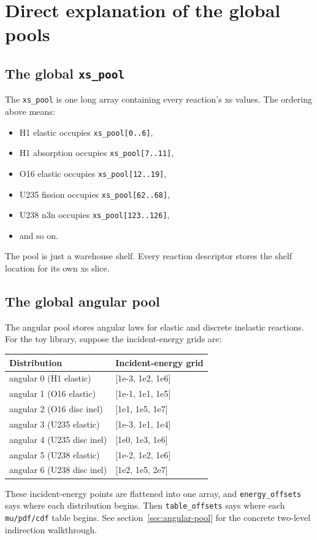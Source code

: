 \documentclass[11pt,a4paper]{article}
\begin{document}
\section{Direct explanation of the global pools}
\subsection{The global \texttt{xs\_pool}}
The \texttt{xs\_pool} is one long array containing every reaction's xs values. The ordering above means:
\begin{itemize}[leftmargin=1.4em]
  \item H1 elastic occupies \texttt{xs\_pool[0..6]},
  \item H1 absorption occupies \texttt{xs\_pool[7..11]},
  \item O16 elastic occupies \texttt{xs\_pool[12..19]},
  \item U235 fission occupies \texttt{xs\_pool[62..68]},
  \item U238 n3n occupies \texttt{xs\_pool[123..126]},
  \item and so on.
\end{itemize}
The pool is just a warehouse shelf. Every reaction descriptor stores the shelf location for its own xs slice.

\subsection{The global angular pool}
The angular pool stores angular laws for elastic and discrete inelastic reactions.
For the toy library, suppose the incident-energy grids are:
\begin{longtable}{p{4.5cm} p{7.0cm}}
\toprule
Distribution & Incident-energy grid \\
\midrule
angular 0 (H1 elastic) & [1e-3, 1e2, 1e6] \\
angular 1 (O16 elastic) & [1e-1, 1e1, 1e5] \\
angular 2 (O16 disc inel) & [1e1, 1e5, 1e7] \\
angular 3 (U235 elastic) & [1e-3, 1e1, 1e4] \\
angular 4 (U235 disc inel) & [1e0, 1e3, 1e6] \\
angular 5 (U238 elastic) & [1e-2, 1e2, 1e6] \\
angular 6 (U238 disc inel) & [1e2, 1e5, 2e7] \\
\bottomrule
\end{longtable}
These incident-energy points are flattened into one array, and \texttt{energy\_offsets} says where each distribution begins. Then \texttt{table\_offsets} says where each \texttt{mu/pdf/cdf} table begins. See section~\ref{sec:angular-pool} for the concrete two-level indirection walkthrough.
\end{document}
